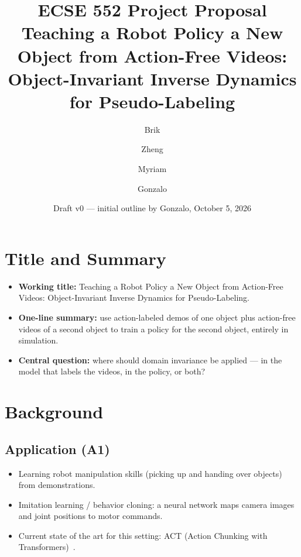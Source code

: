 \documentclass[11pt]{article}
\title{ECSE 552 Project Proposal\\[0.5em]
\large Teaching a Robot Policy a New Object from Action-Free Videos:\\
Object-Invariant Inverse Dynamics for Pseudo-Labeling}
\author{Brik \and Zheng \and Myriam \and Gonzalo}
\date{Draft v0 --- initial outline by Gonzalo, October 5, 2026}
\begin{document}
\maketitle

\section{Title and Summary}

\begin{itemize}
  \item \textbf{Working title:} Teaching a Robot Policy a New Object from
    Action-Free Videos: Object-Invariant Inverse Dynamics for Pseudo-Labeling.
  \item \textbf{One-line summary:} use action-labeled demos of one object plus
    action-free videos of a second object to train a policy for the second
    object, entirely in simulation.
  \item \textbf{Central question:} where should domain invariance be applied ---
    in the model that labels the videos, in the policy, or both?
\end{itemize}

\section{Background}

\subsection{Application (A1)}
\begin{itemize}
  \item Learning robot manipulation skills (picking up and handing over
    objects) from demonstrations.
  \item Imitation learning / behavior cloning: a neural network maps camera
    images and joint positions to motor commands.
  \item Current state of the art for this setting: ACT (Action Chunking with
    Transformers)~\cite{zhao2023act}.
\end{itemize}
\end{document}
